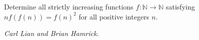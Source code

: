 Determine all strictly increasing functions $f: \mathbb{N}\to\mathbb{N}$ satisfying $nf(f(n))=f(n)^2$ for all positive integers $n$.

\textit{Carl Lian and Brian Hamrick.}